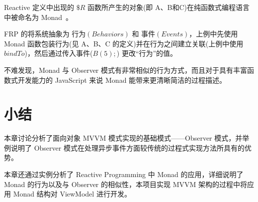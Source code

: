 Reactive 定义中出现的 $\$R$ 函数所产生的对象(即 A、B和C)在纯函数式编程语言中被命名为 Monad~\cite{raey}。

FRP 的将系统抽象为 $行为(Behaviors)$ 和 $事件(Events)$，上例中先使用 Monad 函数包装行为(见 A、B、C 的定义)并在行为之间建立关联(上例中使用 $bindTo$)，然后通过传入事件($B(5);$) 更改“行为”的值。

不难发现，Monad 与 Observer 模式有非常相似的行为方式，而且对于具有丰富函数式开发能力的 JavaScript 来说 Monad 能带来更清晰简洁的过程描述。

\section{小结}

本章讨论分析了面向对象 MVVM 模式实现的基础模式——Observer 模式，并举例说明了 Observer 模式在处理异步事件方面较传统的过程式实现方法所具有的优势。

本章还通过实例分析了 Reactive Programming 中 Monad 的应用，详细说明了 Monad 的行为以及与 Observer 的相似性，本项目实现 MVVM 架构的过程中将应用 Monad 结构对 ViewModel 进行开发。

